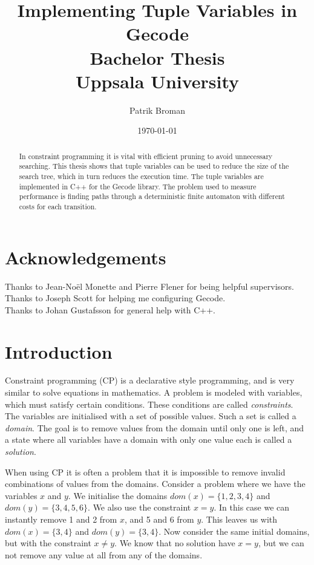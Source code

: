 \documentclass[a4paper,11pt]{article}
\title{\textbf{Implementing Tuple Variables in Gecode\\
	Bachelor Thesis \\
    Uppsala University  \\
  }
}
\author{Patrik Broman}
\date{\today}
\begin{document}
\maketitle

\begin{abstract}

In constraint programming it is vital with efficient pruning to avoid unnecessary searching. This thesis shows that tuple variables can be used to reduce the size of the search tree, which in turn reduces the execution time. The tuple variables are implemented in C++ for the Gecode library. The problem used to measure performance is finding paths through a deterministic finite automaton with different costs for each transition.
\end{abstract}

\setcounter{tocdepth}{2}
\tableofcontents
\pagestyle{plain}

\section*{Acknowledgements}
Thanks to Jean-No\"{e}l Monette and Pierre Flener for being helpful supervisors. \\
Thanks to Joseph Scott for helping me configuring Gecode. \\
Thanks to Johan Gustafsson for general help with C++. \\

\section{Introduction}
Constraint programming (CP) is a declarative style programming, and is very similar to solve equations in mathematics. A problem is modeled with variables, which must satisfy certain conditions. These conditions are called \textit{constraints}. The variables are initialised with a set of possible values. Such a set is called a \textit{domain}. The goal is to remove values from the domain until only one is left, and a state where all variables have a domain with only one value each is called a \textit{solution}.

When using CP it is often a problem that it is impossible to remove invalid combinations of values from the domains. Consider a problem where we have the variables $x$ and $y$. We initialise the domains $dom(x)=\{1,2,3,4\}$ and $dom(y)=\{3,4,5,6\}$. We also use the constraint $x=y$. In this case we can instantly remove 1 and 2 from $x$, and 5 and 6 from $y$. This leaves us with $dom(x)=\{3,4\}$ and $dom(y)=\{3,4\}$. Now consider the same initial domains, but with the constraint $x\neq y$. We know that no solution have $x=y$, but we can not remove any value at all from any of the domains. 
\end{document}
